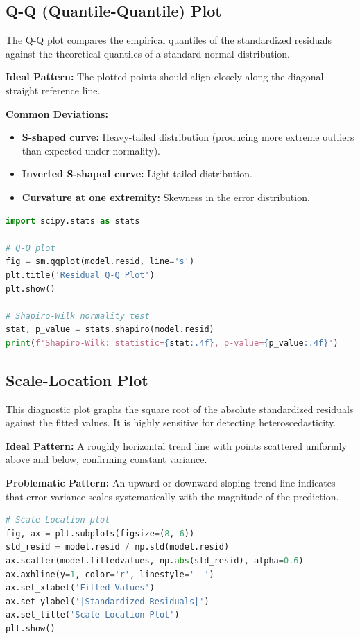 \subsection{Q-Q (Quantile-Quantile) Plot}

The Q-Q plot compares the empirical quantiles of the standardized residuals against the theoretical quantiles of a standard normal distribution.

\textbf{Ideal Pattern:} The plotted points should align closely along the diagonal straight reference line.

\textbf{Common Deviations:}
\begin{itemize}
	\item \textbf{S-shaped curve:} Heavy-tailed distribution (producing more extreme outliers than expected under normality).
	\item \textbf{Inverted S-shaped curve:} Light-tailed distribution.
	\item \textbf{Curvature at one extremity:} Skewness in the error distribution.
\end{itemize}

\begin{lstlisting}[language=Python]
import scipy.stats as stats

# Q-Q plot
fig = sm.qqplot(model.resid, line='s')
plt.title('Residual Q-Q Plot')
plt.show()

# Shapiro-Wilk normality test
stat, p_value = stats.shapiro(model.resid)
print(f'Shapiro-Wilk: statistic={stat:.4f}, p-value={p_value:.4f}')
\end{lstlisting}

\subsection{Scale-Location Plot}

This diagnostic plot graphs the square root of the absolute standardized residuals against the fitted values. It is highly sensitive for detecting heteroscedasticity.

\textbf{Ideal Pattern:} A roughly horizontal trend line with points scattered uniformly above and below, confirming constant variance.

\textbf{Problematic Pattern:} An upward or downward sloping trend line indicates that error variance scales systematically with the magnitude of the prediction.

\begin{lstlisting}[language=Python]
# Scale-Location plot
fig, ax = plt.subplots(figsize=(8, 6))
std_resid = model.resid / np.std(model.resid)
ax.scatter(model.fittedvalues, np.abs(std_resid), alpha=0.6)
ax.axhline(y=1, color='r', linestyle='--')
ax.set_xlabel('Fitted Values')
ax.set_ylabel('|Standardized Residuals|')
ax.set_title('Scale-Location Plot')
plt.show()
\end{lstlisting}

